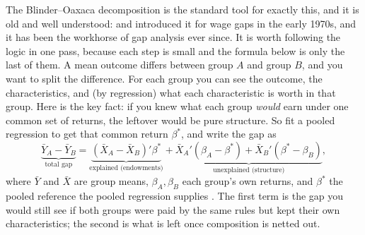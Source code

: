The Blinder--Oaxaca decomposition is the standard tool for exactly this, and it is old and well understood: \textcite{blinder1973wage} and \textcite{oaxaca1973male} introduced it for wage gaps in the early 1970s, and it has been the workhorse of gap analysis ever since. It is worth following the logic in one pass, because each step is small and the formula below is only the last of them. A mean outcome differs between group $A$ and group $B$, and you want to split the difference. For each group you can see the outcome, the characteristics, and (by regression) what each characteristic is worth in that group. Here is the key fact: if you knew what each group \emph{would} earn under one common set of returns, the leftover would be pure structure. So fit a pooled regression to get that common return $\beta^\ast$, and write the gap as
\[
\underbrace{\bar Y_A-\bar Y_B}_{\text{total gap}}
=\underbrace{(\bar X_A-\bar X_B)'\beta^\ast}_{\text{explained (endowments)}}
+\underbrace{\bar X_A'(\beta_A-\beta^\ast)+\bar X_B'(\beta^\ast-\beta_B)}_{\text{unexplained (structure)}},
\]
where $\bar Y$ and $\bar X$ are group means, $\beta_A,\beta_B$ each group's own returns, and $\beta^\ast$ the pooled reference the pooled regression supplies \parencite{jann2008oaxaca}. The first term is the gap you would still see if both groups were paid by the same rules but kept their own characteristics; the second is what is left once composition is netted out.

